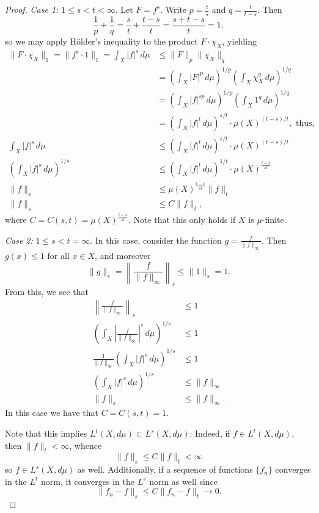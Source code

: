 \documentclass[11pt,oneside,english]{amsart}
\theoremstyle{definition}
\begin{document}
\begin{enumerate}
\begin{proof}
\textit{Case 1:} $1\leq s< t<\infty$. Let $F=f^s$. Write $p=\frac{t}{s}$ and $q=\frac{t}{t-s}$. Then
\[
\frac{1}{p}+\frac{1}{q}=\frac{s}{t}+\frac{t-s}{t}=\frac{s+t-s}{t}=1,
\]
so we may apply H\"older's inequality to the product $F\cdot\chi_X$, yielding
\begin{align*}
\|F\cdot\chi_X\|_1=\|f^s\cdot1\|_1=\int_X|f|^s\,d\mu&\leq\|F\|_p\|\chi_X\|_q\\[2mm]
&=\left(\int_X|F|^p\,d\mu\right)^{1/p}\left(\int_X\chi_X^q\,d\mu\right)^{1/q}\\[2mm]
&=\left(\int_X|f|^{sp}\,d\mu\right)^{1/p}\left(\int_X1^q\,d\mu\right)^{1/q}\\[2mm]
&=\left(\int_X|f|^t\,d\mu\right)^{s/t}\cdot\mu(X)^{(t-s)/t},\text{ thus,}\\[5mm]
\int_X|f|^s\,d\mu&\leq\left(\int_X|f|^t\,d\mu\right)^{s/t}\cdot\mu(X)^{(t-s)/t}\\[5mm]
\left(\int_X|f|^s\,d\mu\right)^{1/s}&\leq \left(\int_X|f|^t\,d\mu\right)^{1/t}\cdot\mu(X)^{\frac{t-s}{st}}\\[2mm]
\|f\|_s&\leq\mu(X)^{\frac{t-s}{st}}\|f\|_t\\[2mm]
\|f\|_s&\leq C\|f\|_t,
\end{align*}
where $C=C(s,t)=\mu(X)^{\frac{t-s}{st}}$. Note that this only holds if $X$ is $\mu$-finite.

\textit{Case 2:} $1\leq s<t=\infty$. In this case, consider the function $g=\frac{f}{\|f\|_\infty}$. Then $g(x)\leq 1$ for all $x\in X$, and moreover
\[
\|g\|_s=\left\|\frac{f}{\|f\|_\infty}\right\|_s\leq\|1\|_s=1.
\]
From this, we see that
\begin{align*}
\left\|\frac{f}{\|f\|_\infty}\right\|_s&\leq1\\[2mm]
\left(\int_X\left|\frac{f}{\|f\|_\infty}\right|^s\,d\mu\right)^{1/s}&\leq 1\\[2mm]
\frac{1}{\|f\|_\infty}\left(\int_X|f|^s\,d\mu\right)^{1/s}&\leq1\\[2mm]
\left(\int_X|f|^s\,d\mu\right)^{1/s}&\leq\|f\|_\infty\\[2mm]
\|f\|_s&\leq\|f\|_\infty.
\end{align*}
In this case we have that $C=C(s,t)=1$.

Note that this implies $L^t(X,d\mu)\subset L^s(X,d\mu)$: Indeed, if $f\in L^t(X,d\mu)$, then $\|f\|_t<\infty$, whence
\[
\|f\|_s\leq C\|f\|_t<\infty
\]
so $f\in L^s(X,d\mu)$ as well. Additionally, if a sequence of functions $\{f_n\}$ converges in the $L^t$ norm, it converges in the $L^s$ norm as well since
\[
\|f_n-f\|_s\leq C\|f_n-f\|_t\to0.
\]
\end{proof}


\end{enumerate}
\end{document}
